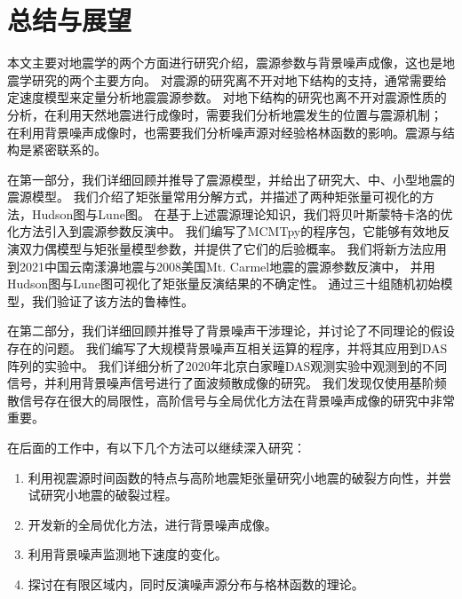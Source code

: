 \chapter{总结与展望}

本文主要对地震学的两个方面进行研究介绍，震源参数与背景噪声成像，这也是地震学研究的两个主要方向。
对震源的研究离不开对地下结构的支持，通常需要给定速度模型来定量分析地震震源参数。
对地下结构的研究也离不开对震源性质的分析，在利用天然地震进行成像时，需要我们分析地震发生的位置与震源机制；
在利用背景噪声成像时，也需要我们分析噪声源对经验格林函数的影响。震源与结构是紧密联系的。

在第一部分，我们详细回顾并推导了震源模型，并给出了研究大、中、小型地震的震源模型。
我们介绍了矩张量常用分解方式，并描述了两种矩张量可视化的方法，Hudson图与Lune图。
在基于上述震源理论知识，我们将贝叶斯蒙特卡洛的优化方法引入到震源参数反演中。
我们编写了MCMTpy的程序包，它能够有效地反演双力偶模型与矩张量模型参数，并提供了它们的后验概率。
我们将新方法应用到2021中国云南漾濞地震与2008美国Mt. Carmel地震的震源参数反演中，
并用Hudson图与Lune图可视化了矩张量反演结果的不确定性。
通过三十组随机初始模型，我们验证了该方法的鲁棒性。

在第二部分，我们详细回顾并推导了背景噪声干涉理论，并讨论了不同理论的假设存在的问题。
我们编写了大规模背景噪声互相关运算的程序，并将其应用到DAS阵列的实验中。
我们详细分析了2020年北京白家疃DAS观测实验中观测到的不同信号，并利用背景噪声信号进行了面波频散成像的研究。
我们发现仅使用基阶频散信号存在很大的局限性，高阶信号与全局优化方法在背景噪声成像的研究中非常重要。

在后面的工作中，有以下几个方法可以继续深入研究：
\begin{enumerate}
    \item 利用视震源时间函数的特点与高阶地震矩张量研究小地震的破裂方向性，并尝试研究小地震的破裂过程。
    \item 开发新的全局优化方法，进行背景噪声成像。
    \item 利用背景噪声监测地下速度的变化。
    \item 探讨在有限区域内，同时反演噪声源分布与格林函数的理论。
\end{enumerate}
